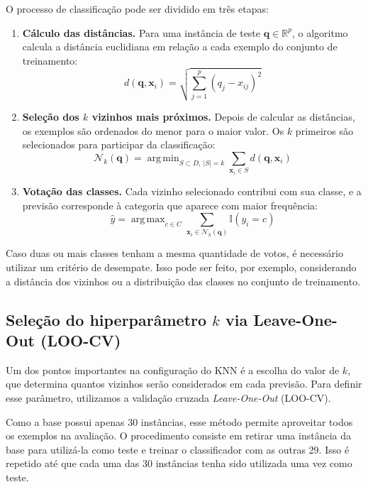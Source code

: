 \documentclass[12pt, a4paper]{article}
\begin{document}
O processo de classificação pode ser dividido em três etapas:

\begin{enumerate}[leftmargin=2em]
  \item \textbf{Cálculo das distâncias.} Para uma instância de teste $\mathbf{q} \in \mathbb{R}^p$, o algoritmo calcula a distância euclidiana em relação a cada exemplo do conjunto de treinamento:
  \begin{equation}
    d(\mathbf{q}, \mathbf{x}_i) = \sqrt{\sum_{j=1}^{p} (q_j - x_{ij})^2}
  \end{equation}
  \item \textbf{Seleção dos $k$ vizinhos mais próximos.} Depois de calcular as distâncias, os exemplos são ordenados do menor para o maior valor. Os $k$ primeiros são selecionados para participar da classificação:
  \begin{equation}
    \mathcal{N}_k(\mathbf{q}) = \operatorname{arg\,min}_{S \subset D,\ |S|=k} \sum_{\mathbf{x}_i \in S} d(\mathbf{q}, \mathbf{x}_i)
  \end{equation}
  \item \textbf{Votação das classes.} Cada vizinho selecionado contribui com sua classe, e a previsão corresponde à categoria que aparece com maior frequência:
  \begin{equation}
    \hat{y} = \operatorname{arg\,max}_{c \in C} \sum_{\mathbf{x}_i \in \mathcal{N}_k(\mathbf{q})} \mathbb{I}(y_i = c)
  \end{equation}
\end{enumerate}

Caso duas ou mais classes tenham a mesma quantidade de votos, é necessário utilizar um critério de desempate. Isso pode ser feito, por exemplo, considerando a distância dos vizinhos ou a distribuição das classes no conjunto de treinamento.

\subsection{Seleção do hiperparâmetro $k$ via Leave-One-Out (LOO-CV)}

Um dos pontos importantes na configuração do KNN é a escolha do valor de $k$, que determina quantos vizinhos serão considerados em cada previsão. Para definir esse parâmetro, utilizamos a validação cruzada \textit{Leave-One-Out} (LOO-CV).

Como a base possui apenas 30 instâncias, esse método permite aproveitar todos os exemplos na avaliação. O procedimento consiste em retirar uma instância da base para utilizá-la como teste e treinar o classificador com as outras 29. Isso é repetido até que cada uma das 30 instâncias tenha sido utilizada uma vez como teste.
\end{document}

